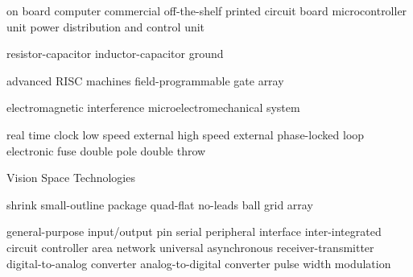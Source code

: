      {on board computer}
    {commercial off-the-shelf}
     {printed circuit board}
     {microcontroller unit}
    {power distribution and control unit}

      {resistor-capacitor}
      {inductor-capacitor}
     {ground}

     {advanced RISC machines}
    {field-programmable gate array}

     {electromagnetic interference}
    {microelectromechanical system}

     {real time clock}
     {low speed external}
     {high speed external}
     {phase-locked loop}
   {electronic fuse}
    {double pole double throw}

     {Vision Space Technologies}

    {shrink small-outline package}
     {quad-flat no-leads}
     {ball grid array}

    {general-purpose input/output pin}
     {serial peripheral interface}
     {inter-integrated circuit}
     {controller area network}
    {universal asynchronous receiver-transmitter}
     {digital-to-analog converter}
     {analog-to-digital converter}
     {pulse width modulation}
